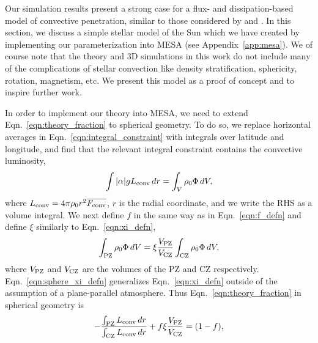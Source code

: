 \documentclass[twocolumn]{aastex631}
\renewcommand{\bar}[1]{\overline{#1}}
\begin{document}
Our simulation results present a strong case for a flux- and dissipation-based model of convective penetration, similar to those considered by \citet{zahn1991} and \citet{roxburgh1989}.
In this section, we discuss a simple stellar model of the Sun which we have created by implementing our parameterization into MESA (see Appendix~\ref{app:mesa}).
We of course note that the theory and 3D simulations in this work do not include many of the complications of stellar convection like density stratification, sphericity, rotation, magnetism, etc.
We present this model as a proof of concept and to inspire further work.

In order to implement our theory into MESA, we need to extend Eqn.~\ref{eqn:theory_fraction} to spherical geometry.
To do so, we replace horizontal averages in Eqn.~\ref{eqn:integral_constraint} with integrals over latitude and longitude, and find that the relevant integral constraint contains the convective luminosity,
\begin{equation}
\int |\alpha| g L_{\rm{conv}}\,dr =   \int_V \rho_0 \Phi\,dV,
\label{eqn:mesa_integral_constraint}
\end{equation}
where $L_{\rm{conv}} = 4\pi\rho_0 r^2 \bar{F_{\rm{conv}}}$, $r$ is the radial coordinate, and we write the RHS as a volume integral.
We next define $f$ in the same way as in Eqn.~\ref{eqn:f_defn} and define $\xi$ similarly to Eqn.~\ref{eqn:xi_defn},
\begin{equation}
\int_{\rm{PZ}} \rho_0 \Phi \,dV = \xi \frac{V_{\rm{PZ}}}{V_{\rm{CZ}}}\int_{\rm{CZ}}\rho_0 \Phi \, dV,
\label{eqn:sphere_xi_defn}
\end{equation}
where $V_{\rm{PZ}}$ and $V_{\rm{CZ}}$ are the volumes of the PZ and CZ respectively.
Eqn.~\ref{eqn:sphere_xi_defn} generalizes Eqn.~\ref{eqn:xi_defn} outside of the assumption of a plane-parallel atmosphere.
Thus Eqn.~\ref{eqn:theory_fraction} in spherical geometry is
\begin{equation}
-\frac{\int_{\rm{PZ}} L_{\rm{conv}}\,dr}{\int_{\rm{CZ}} L_{\rm{conv}}\,dr} + f \xi \frac{V_{\rm{PZ}}}{V_{\rm{CZ}}} = (1 - f),
\label{eqn:mesa_eqn}
\end{equation}
\end{document}
